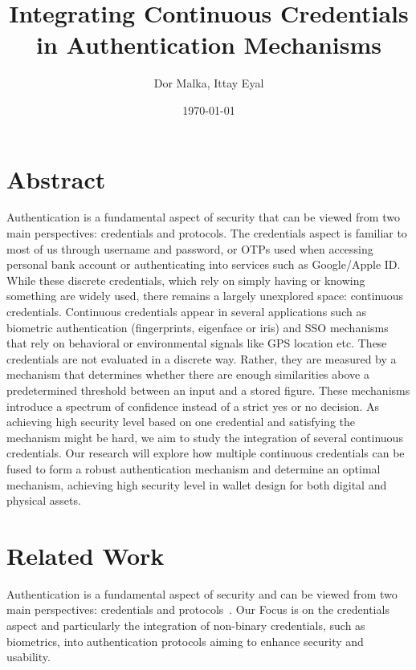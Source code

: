 \documentclass{article}
\title{Integrating Continuous Credentials in Authentication
Mechanisms}
\author{Dor Malka, Ittay Eyal}
\date{\today}
\begin{document}
\maketitle

\section{Abstract}
Authentication is a fundamental aspect of security that can be viewed from two main perspectives:
credentials and protocols. The credentials aspect is familiar to most of us through username and
password, or OTPs used when accessing personal bank account or authenticating into services such
as Google/Apple ID. While these discrete credentials, which rely on simply having or knowing
something are widely used, there remains a largely unexplored space: continuous credentials.
Continuous credentials appear in several applications such as biometric authentication (fingerprints,
eigenface or iris) and SSO mechanisms that rely on behavioral or environmental signals like
GPS location etc. These credentials are not evaluated in a discrete way. Rather, they are measured
by a mechanism that determines whether there are enough similarities above a predetermined
threshold between an input and a stored figure.
These mechanisms introduce a spectrum of confidence instead of a strict yes or no decision.
As achieving high security level based on one credential and satisfying the mechanism might be
hard, we aim to study the integration of several continuous credentials. Our research will explore
how multiple continuous credentials can be fused to form a robust authentication mechanism and
determine an optimal mechanism, achieving high security level in wallet design for both digital and
physical assets.
\section{Related Work}
Authentication is a fundamental aspect of security and can be viewed from two main perspectives: credentials and protocols~\cite{mouallem2024}.
Our Focus is on the credentials aspect and particularly the integration of non-binary credentials, such as biometrics, into authentication protocols aiming to enhance security and usability.
\end{document}
